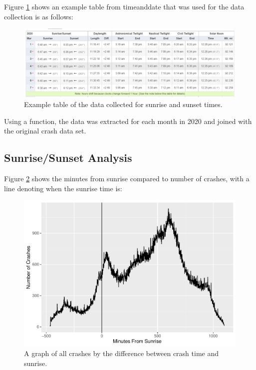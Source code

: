 \documentclass[conference,final,]{IEEEtran}
\begin{document}
Figure \ref{fig:timeanddate} shows an example table from timeanddate that was used for the data collection is as follows:

\begin{figure}

{\centering \includegraphics[width=0.9\columnwidth]{../images/paste-5719206D} 

}

\caption{Example table of the data collected for sunrise and sunset times.}\label{fig:timeanddate}
\end{figure}

Using a function, the data was extracted for each month in 2020 and joined with the original crash data set.

\hypertarget{sunrisesunset-analysis-1}{%
\subsection{Sunrise/Sunset Analysis}\label{sunrisesunset-analysis-1}}

Figure \ref{fig:sunrise} shows the minutes from sunrise compared to number of crashes, with a line denoting when the sunrise time is:

\begin{figure}

{\centering \includegraphics[width=0.9\columnwidth]{CAUSE_files/figure-latex/sunrise-1} 

}

\caption{A graph of all crashes by the difference between crash time and sunrise.}\label{fig:sunrise}
\end{figure}
\end{document}
